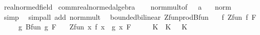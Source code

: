 \begin{isabellebody}
\isanewline
{}\isamarkupfalse%
\ real{\isacharunderscore}{\kern0pt}normed{\isacharunderscore}{\kern0pt}field\isanewline
{}\isanewline
\isanewline
{}\isamarkupfalse%
\ comm{\isacharunderscore}{\kern0pt}real{\isacharunderscore}{\kern0pt}normed{\isacharunderscore}{\kern0pt}algebra{\isacharunderscore}{\kern0pt}{}\isanewline
%
\isadelimproof
%
\endisadelimproof
%
\isatagproof
{}\isamarkupfalse%
\isanewline
\ \ \isamarkupfalse%
\ norm{\isacharunderscore}{\kern0pt}mult{\isacharbrackleft}{\kern0pt}of\ {\isachardoublequoteopen}{}\ {\isacharcolon}{\kern0pt}{\isacharcolon}{\kern0pt}\ {\isacharprime}{\kern0pt}a{\isachardoublequoteclose}\ {}{\isacharbrackright}{\kern0pt}\ \isamarkupfalse%
\ {\isachardoublequoteopen}norm\ {}\ {\isacharequal}{\kern0pt}\ {}{\isachardoublequoteclose}\ \isamarkupfalse%
\ simp\ \isanewline
{}\isamarkupfalse%
\ {\isacharparenleft}{\kern0pt}simp{\isacharunderscore}{\kern0pt}all\ add{\isacharcolon}{\kern0pt}\ norm{\isacharunderscore}{\kern0pt}mult{\isacharparenright}{\kern0pt}%
\endisatagproof
{\isafoldproof}%
%
\isadelimproof
\isanewline
%
\endisadelimproof
\isanewline
{}\isamarkupfalse%
%
\isadelimdocument
%
\endisadelimdocument
%
\isatagdocument
%
\isamarkuptrue%
%
\endisatagdocument
{\isafolddocument}%
%
\isadelimdocument
%
\endisadelimdocument
{}\isamarkupfalse%
\ {\isacharparenleft}{\kern0pt}\ bounded{\isacharunderscore}{\kern0pt}bilinear{\isacharparenright}{\kern0pt}\ Zfun{\isacharunderscore}{\kern0pt}prod{\isacharunderscore}{\kern0pt}Bfun{\isacharcolon}{\kern0pt}\isanewline
\ \ \ f{\isacharcolon}{\kern0pt}\ {\isachardoublequoteopen}Zfun\ f\ F{\isachardoublequoteclose}\isanewline
\ \ \ \ \ g{\isacharcolon}{\kern0pt}\ {\isachardoublequoteopen}Bfun\ g\ F{\isachardoublequoteclose}\isanewline
\ \ \ {\isachardoublequoteopen}Zfun\ {\isacharparenleft}{\kern0pt}{\isasymlambda}x{\isachardot}{\kern0pt}\ f\ x\ {\isacharasterisk}{\kern0pt}{\isacharasterisk}{\kern0pt}\ g\ x{\isacharparenright}{\kern0pt}\ F{\isachardoublequoteclose}\isanewline
%
\isadelimproof
%
\endisadelimproof
%
\isatagproof
{}\isamarkupfalse%
\ {\isacharminus}{\kern0pt}\isanewline
\ \ \isamarkupfalse%
\ K\ \ K{\isacharcolon}{\kern0pt}\ {\isachardoublequoteopen}{}\ {\isasymle}\ K{\isachardoublequoteclose}\isanewline

\end{isabellebody}
